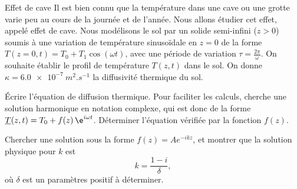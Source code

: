 \begin{exo}[PC][3][colle]{Effet de cave}
  Il est bien connu que la température dans une cave ou une grotte varie peu au cours de la journée et de l'année. Nous allons étudier cet effet, appelé effet de cave.
  Nous modélisons le sol par un solide semi-infini ($z>0$) soumis à une variation de température sinusoïdale en $z=0$ de la forme $T(z=0,t)=T_{0}+T_1\cos(\omega t)$, avec une période de variation $\tau=\textstyle\frac{2\pi}{\omega}$. On souhaite établir le profil de température $T(z,t)$ dans le sol. On donne $\kappa = \SI{6.0e-7}{m^2.s^{-1}}$ la diffusivité thermique du sol.
\begin{quest}
  \item  Écrire l'équation de diffusion thermique.
  Pour faciliter les calculs, cherche une solution harmonique en notation complexe, qui est donc de la forme $\underline{T}(z,t)=T_{0}+f(z)\,\e^{i\omega t}$. Déterminer l'équation vérifiée par la fonction $f(z)$.

  \item Chercher une solution sous la forme $f(z) = A e^{-ikz}$, et montrer que la solution physique pour $k$ est
  \begin{equation}
    k =  \frac{1-i}{\delta},
  \end{equation}
  où $\delta$ est un paramètres positif à déterminer.


\end{quest}
\end{exo}
